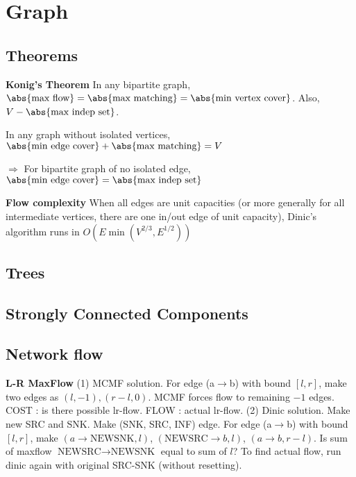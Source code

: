 \chapter{Graph}

\section{Theorems}
{\footnotesize\textbf{Konig's Theorem} In any bipartite graph, $\abs{\text{max flow}} = \abs{\text{max matching}} = \abs{\text{min vertex cover}}$. Also, $V - \abs{\text{max indep set}}$. 

In any graph without isolated vertices, $\abs{\text{min edge cover}} + \abs{\text{max matching}} = V$

$\Rightarrow$ For bipartite graph of no isolated edge,  $\abs{\text{min edge cover}} = \abs{\text{max indep set}}$

\textbf{Flow complexity} When all edges are unit capacities (or more generally for all intermediate vertices, there are one in/out edge of unit capacity), Dinic's algorithm runs in $O(E \min(V^{2/3}, E^{1/2}))$}
\section{Trees}

\section{Strongly Connected Components}

\section{Network flow}
    {\footnotesize
	\textbf{L-R MaxFlow} (1) MCMF solution. For edge (a$\to$b) with bound $[l, r]$, make two edges as $(l, -1), (r-l ,0)$. MCMF forces flow to remaining $-1$ edges. COST : is there possible lr-flow. FLOW : actual lr-flow. (2) Dinic solution. Make new SRC and SNK. Make (SNK, SRC, INF) edge. For edge (a$\to$b) with bound $[l, r]$, make $(a \to \text{NEWSNK}, l)$, $(\text{NEWSRC} \to b, l)$, $(a\to b, r-l)$. Is sum of maxflow $\text{NEWSRC} \to \text{NEWSNK}$ equal to sum of $l$? To find actual flow, run dinic again with original SRC-SNK (without resetting).}


